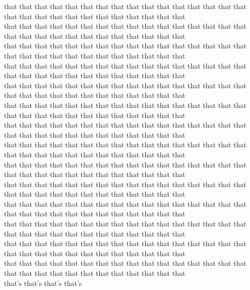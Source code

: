 that that that that that that that that that that that that that that that that that that that that that that that that that that that that\\
that that that that that that that that that that that that that that that that that that that that that that that that that that that that\\
that that that that that that that that that that that that that that that that that that that that that that that that that that that that\\
that that that that that that that that that that that that that that that that that that that that that that that that that that that that\\
that that that that that that that that that that that that that that that that that that that that that that that that that that that that\\
that that that that that that that that that that that that that that that that that that that that that that that that that that that that\\
that that that that that that that that that that that that that that that that that that that that that that that that that that that that\\
that that that that that that that that that that that that that that that that that that that that that that that that that that that that\\
that that that that that that that that that that that that that that that that that that that that that that that that that that that that\\
that that that that that that that that that that that that that that that that that that that that that that that that that that that that\\
that that that that that that that that that that that that that that that that that that that that that that that that that that that that\\
that that that that that that that that that that that that that that that that that that that that that that that that that that that that\\
that that that that that that that that that that that that that that that that that that that that that that that that that that that that\\
that that that that that that that that that that that that that that that that that that that that that that that that that that that that\\
that's that's that's that's\\
